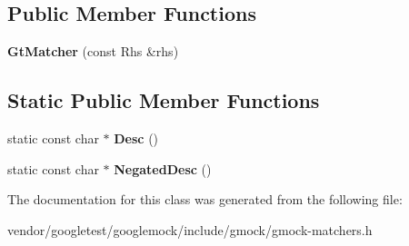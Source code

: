\subsection*{Public Member Functions}
\begin{DoxyCompactItemize}
\item 
\mbox{\label{classtesting_1_1internal_1_1_gt_matcher_aeef0f6dd7c57a2ed0f379d8100de0215}} 
{\bfseries Gt\+Matcher} (const Rhs \&rhs)
\end{DoxyCompactItemize}
\subsection*{Static Public Member Functions}
\begin{DoxyCompactItemize}
\item 
\mbox{\label{classtesting_1_1internal_1_1_gt_matcher_ac4e664e328e4400e1cecc9b804de6937}} 
static const char $\ast$ {\bfseries Desc} ()
\item 
\mbox{\label{classtesting_1_1internal_1_1_gt_matcher_ace1dc02e105fd93b638f23433bf682a4}} 
static const char $\ast$ {\bfseries Negated\+Desc} ()
\end{DoxyCompactItemize}


The documentation for this class was generated from the following file\+:\begin{DoxyCompactItemize}
\item 
vendor/googletest/googlemock/include/gmock/gmock-\/matchers.\+h\end{DoxyCompactItemize}
